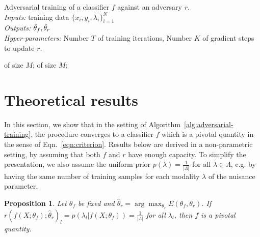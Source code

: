 \documentclass{article}
\theoremstyle{plain}
\newtheorem{proposition}[theorem]{Proposition}
\begin{document}
\begin{algorithm}
\caption{Adversarial training of a classifier $f$ against an adversary $r$.\\
{\it Inputs:} training data $\{ x_i, y_i, \lambda_i \}_{i=1}^N$\\
{\it Outputs:} $\smash{\hat\theta_f}, \smash{\hat\theta_r}$\\
{\it Hyper-parameters:} Number $T$ of training iterations, Number $K$ of gradient steps to update $r$.}
\label{alg:adversarial-training}
\begin{algorithmic}[1]
         
             of size $M$;
        \EndFor
         of size $M$; 
    \EndFor
\end{algorithmic}
\end{algorithm}


\section{Theoretical results}

In this section, we show that in the setting of
Algorithm~\ref{alg:adversarial-training}, the procedure converges to a
classifier $f$ which is a pivotal quantity in the sense of
Eqn.~\ref{eqn:criterion}. Results below are derived in a non-parametric setting,
by assuming that both $f$ and $r$ have enough capacity. To simplify the
presentation, we also assume the uniform prior $p(\lambda) =
\frac{1}{|\Lambda|}$ for all $\lambda \in \Lambda$, e.g. by having the same
number of training samples for each modality $\lambda$ of the nuisance
parameter.


\begin{proposition}

Let $\theta_f$ be fixed and $\hat\theta_r = \arg \max_{\theta_r} E(\theta_f,
\theta_r)$. If $r(f(X;\theta_f) ; \hat\theta_r )_l = p(\lambda_l| f(X; \theta_f)) = \frac{1}{|\Lambda|}$
for all $\lambda_l$, then $f$ is a pivotal quantity.

\end{proposition}
\end{document}
